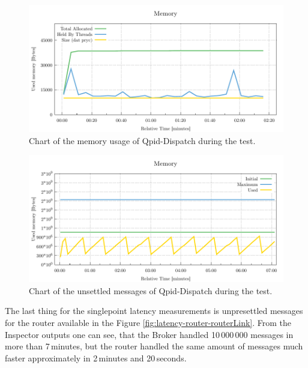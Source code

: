 \begin{figure}[H]
	\centering
	\includegraphics[width=1\linewidth]{obrazky-figures/charts/singlepoint-router-latency-memory.pdf}
	\caption{Chart of the memory usage of Qpid-Dispatch during the test.}
	\label{fig:latency-single-router-memory}
\end{figure}

\begin{figure}[H]
	\centering
	\includegraphics[width=1\linewidth]{obrazky-figures/charts/singlepoint-broker-latency-memory.pdf}
	\caption{Chart of the unsettled messages of Qpid-Dispatch during the test.}
	\label{fig:latency-single-broker-memory}
\end{figure}

The last thing for the singlepoint latency measurements is unpresettled messages for the router available in the Figure \ref{fig:latency-router-routerLink}. From the Inspector outputs one can see, that the Broker handled 10\,000\,000 messages in more than 7\,minutes, but the router handled the same amount of messages much faster approximately in 2\,minutes and 20\,seconds.

